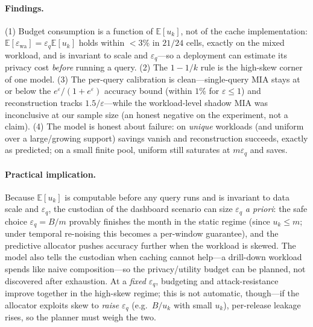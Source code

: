 \documentclass[sigconf,nonacm]{acmart}
\newcommand{\eps}{\varepsilon}
\newcommand{\E}{\mathbb{E}}
\begin{document}
\paragraph{Findings.}
(1) Budget consumption is a function of $\E[u_k]$, not of the cache implementation: $\E[\eps_{\mathrm{wa}}]=\eps_q\E[u_k]$ holds within $<3\%$ in $21/24$ cells, exactly on the mixed workload, and is invariant to scale and $\eps_q$---so a deployment can estimate its privacy cost \emph{before} running a query. (2) The $1-1/k$ rule is the high-skew corner of one model. (3) The per-query calibration is clean---single-query MIA stays at or below the $e^\eps/(1+e^\eps)$ accuracy bound (within $1\%$ for $\eps\le1$) and reconstruction tracks $1.5/\eps$---while the workload-level shadow MIA was inconclusive at our sample size (an honest negative on the experiment, not a claim). (4) The model is honest about failure: on \emph{unique} workloads (and uniform over a large/growing support) savings vanish and reconstruction succeeds, exactly as predicted; on a small finite pool, uniform still saturates at $m\eps_q$ and saves.

\paragraph{Practical implication.}
Because $\E[u_k]$ is computable before any query runs and is invariant to data scale and $\eps_q$, the custodian of the dashboard scenario can size $\eps_q$ \emph{a priori}: the safe choice $\eps_q=B/m$ provably finishes the month in the static regime (since $u_k\le m$; under temporal re-noising this becomes a per-window guarantee), and the predictive allocator pushes accuracy further when the workload is skewed. The model also tells the custodian when caching cannot help---a drill-down workload spends like naive composition---so the privacy/utility budget can be planned, not discovered after exhaustion. At a \emph{fixed} $\eps_q$, budgeting and attack-resistance improve together in the high-skew regime; this is not automatic, though---if the allocator exploits skew to \emph{raise} $\eps_q$ (e.g.\ $B/u_k$ with small $u_k$), per-release leakage rises, so the planner must weigh the two.
\end{document}
